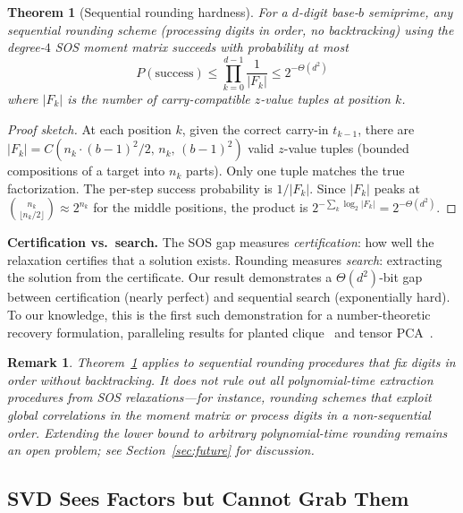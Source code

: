 \documentclass[11pt,a4paper]{article}
\newtheorem{theorem}{Theorem}
\newtheorem{remark}{Remark}
\begin{document}
\begin{theorem}[Sequential rounding hardness]\label{thm:rounding}
For a $d$-digit base-$b$ semiprime, any sequential rounding scheme (processing digits in order, no backtracking) using the degree-$4$ SOS moment matrix succeeds with probability at most
\[
P(\text{success}) \le \prod_{k=0}^{d-1} \frac{1}{|F_k|} \le 2^{-\Theta(d^2)}
\]
where $|F_k|$ is the number of carry-compatible $z$-value tuples at position $k$.
\end{theorem}

\begin{proof}[Proof sketch]
At each position $k$, given the correct carry-in $t_{k-1}$, there are $|F_k| = C(n_k \cdot (b{-}1)^2/2,\, n_k,\, (b{-}1)^2)$ valid $z$-value tuples (bounded compositions of a target into $n_k$ parts).  Only one tuple matches the true factorization.  The per-step success probability is $1/|F_k|$.  Since $|F_k|$ peaks at $\binom{n_k}{\lfloor n_k/2 \rfloor} \approx 2^{n_k}$ for the middle positions, the product is $2^{-\sum_k \log_2 |F_k|} = 2^{-\Theta(d^2)}$.
\end{proof}

\textbf{Certification vs.\ search.}  The SOS gap measures \emph{certification}: how well the relaxation certifies that a solution exists.  Rounding measures \emph{search}: extracting the solution from the certificate.  Our result demonstrates a $\Theta(d^2)$-bit gap between certification (nearly perfect) and sequential search (exponentially hard).  To our knowledge, this is the first such demonstration for a number-theoretic recovery formulation, paralleling results for planted clique~\cite{barak16} and tensor PCA~\cite{hopkins15}.

\begin{remark}
Theorem~\ref{thm:rounding} applies to \emph{sequential} rounding procedures that fix digits in order without backtracking.  It does not rule out all polynomial-time extraction procedures from SOS relaxations---for instance, rounding schemes that exploit global correlations in the moment matrix or process digits in a non-sequential order.  Extending the lower bound to arbitrary polynomial-time rounding remains an open problem; see Section~\ref{sec:future} for discussion.
\end{remark}

\subsection{SVD Sees Factors but Cannot Grab Them}
\end{document}

